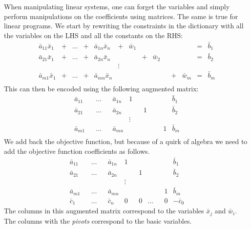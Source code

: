 \documentclass[
]{book}
\theoremstyle{definition}
\theoremstyle{definition}
\theoremstyle{definition}
\theoremstyle{definition}
\theoremstyle{remark}
\begin{document}
When manipulating linear systems, one can forget the variables and simply perform manipulations on the coefficients using matrices.
The same is true for linear programs.
We start by rewriting the constraints in the dictionary with all the variables on the LHS and all the constants on the RHS:
\begin{equation}
  \begin{array}{rrrrrrrrrrrrrr}
      \bar{a}_{11} \bar{x}_1 & + & \dots & + & \bar{a}_{1n} \bar{x}_n & + & \bar{w}_1 & & & & & & = &  \bar{b}_1\\
      \bar{a}_{21} \bar{x}_1 & + & \dots & + & \bar{a}_{2n} \bar{x}_n & & & + & \bar{w}_2 & & & & = &  \bar{b}_2\\
      & & & & & \vdots &  \\
      \bar{a}_{m1} \bar{x}_1 & + & \dots & + & \bar{a}_{mn} \bar{x}_n & & & & & & + & \bar{w}_m & = & \bar{b}_m\\
  \end{array} 
  \label{eq:standard-tableau}
\end{equation}
This can then be encoded using the following augmented matrix:
\begin{equation*}
  \begin{array}{rrrrrrrrrrr|r}
      \bar{a}_{11}  & & \dots & & \bar{a}_{1n}  & 1 & & & & & &\bar{b}_1\\
      \bar{a}_{21}  & & \dots & & \bar{a}_{2n}  & & & 1 & & & &\bar{b}_2\\
      & & & & & \vdots &  \\
      \bar{a}_{m1}  & & \dots & & \bar{a}_{mn}  & & & & & & 1 &\bar{b}_m\\
  \end{array}
\end{equation*}
We add back the objective function, but because of a quirk of algebra we need to add the objective function coefficients as follows.
\begin{equation*}
 \begin{array}{rrrrrrrrrrr|r}
      \bar{a}_{11}  & & \dots & & \bar{a}_{1n}  & 1 & & & & & &\bar{b}_1\\
      \bar{a}_{21}  & & \dots & & \bar{a}_{2n}  & & & 1 & & & &\bar{b}_2\\
      & & & & & \vdots &  \\
      \bar{a}_{m1}  & & \dots & & \bar{a}_{mn}  & & & & & & 1 &\bar{b}_m\\ \hline
      \bar{c}_1  & & \dots & & \bar{c}_{n}  & 0 & & 0 & \dots & & 0 &-\bar{c}_0
  \end{array} 
\end{equation*}
The columns in this augmented matrix correspond to the variables \(\bar{x}_j\) and \(\bar{w}_i\). The columns with the \emph{pivots} correspond to the basic variables.
\end{document}
